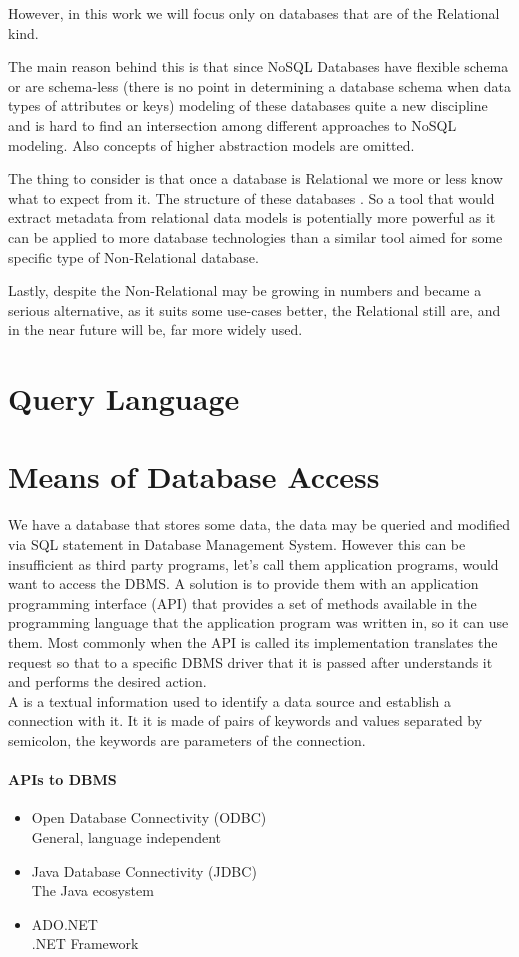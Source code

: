 
However, in this work we will focus only on databases that are of the Relational kind. 

The main reason behind this is that since NoSQL Databases have flexible schema or are schema-less (there is no point in determining a database schema when data types of attributes or keys) modeling of these databases quite a new discipline and is hard to find an intersection among different approaches to NoSQL modeling.
Also concepts of higher abstraction models are omitted. \cite{NoSQLDatabaseModeling}

The thing to consider is that once a database is Relational we more or less know what to expect from it. The structure of these databases . So a tool that would extract metadata from relational data models is potentially more powerful as it can be applied to more database technologies than a similar tool aimed for some specific type of Non-Relational database. 

Lastly, despite the Non-Relational may be growing in numbers and became a serious alternative, as it suits some use-cases better, the Relational still are, and in the near future will be, far more widely used.

\section{Query Language}


\section{Means of Database Access}

We have a database that stores some data, the data may be queried and modified via SQL statement in Database Management System. However this can be insufficient as third party programs, let's call them application programs, would want to access the DBMS. 
A solution is to provide them with an application programming interface (API) that provides a set of methods available in the programming language that the application program was written in, so it can use them.
Most commonly when the API is called its implementation translates the request so that to a specific DBMS driver that it is passed after understands it and performs the desired action. \\

A  is a textual information used to identify a data source and establish a connection with it. It it is made of pairs of keywords and values separated by semicolon, the keywords are parameters of the connection.

\paragraph{APIs to DBMS}
\begin{itemize}
	\item Open Database Connectivity (ODBC)\\
		General, language independent
	\item Java Database Connectivity (JDBC)\\
		The Java ecosystem
	\item ADO.NET\\
		.NET Framework
\end{itemize}